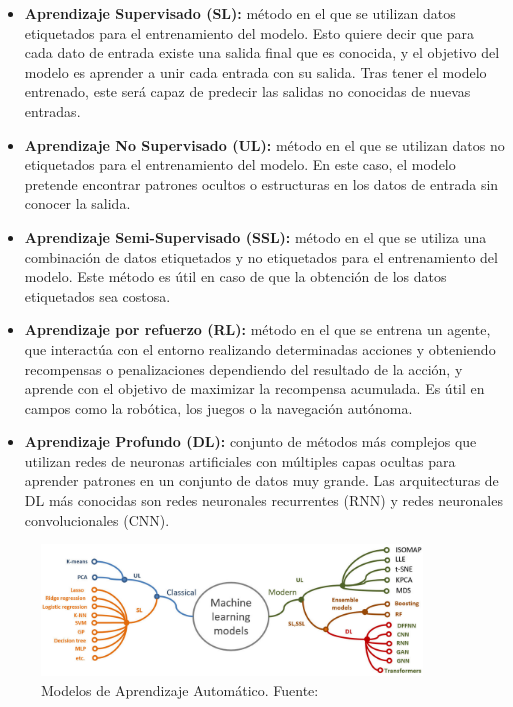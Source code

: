 \documentclass[12pt]{report} %
\begin{document}
\begin{itemize}

    \item \textbf{Aprendizaje Supervisado (SL):} método en el que se utilizan datos etiquetados para el entrenamiento del modelo. Esto quiere decir que para cada dato de entrada existe una salida final que es conocida, y el objetivo del modelo es aprender a unir cada entrada con su salida. Tras tener el modelo entrenado, este será capaz de predecir las salidas no conocidas de nuevas entradas.
    \item \textbf{Aprendizaje No Supervisado (UL):} método en el que se utilizan datos no etiquetados para el entrenamiento del modelo. En este caso, el modelo pretende encontrar patrones ocultos o estructuras en los datos de entrada sin conocer la salida.
    \item \textbf{Aprendizaje Semi-Supervisado (SSL):} método en el que se utiliza una combinación de datos etiquetados y no etiquetados para el entrenamiento del modelo. Este método es útil en caso de que la obtención de los datos etiquetados sea costosa.
    \item \textbf{Aprendizaje por refuerzo (RL):} método en el que se entrena un agente, que interactúa con el entorno realizando determinadas acciones y obteniendo recompensas o penalizaciones dependiendo del resultado de la acción, y aprende con el objetivo de maximizar la recompensa acumulada. Es útil en campos como la robótica, los juegos o la navegación autónoma.
    \item \textbf{Aprendizaje Profundo (DL):} conjunto de métodos más complejos que utilizan redes de neuronas artificiales con múltiples capas ocultas para aprender patrones en un conjunto de datos muy grande. Las arquitecturas de DL más conocidas son redes neuronales recurrentes (RNN) y redes neuronales convolucionales (CNN).

\end{itemize}

\begin{figure}[h]
	\centering
	\includegraphics[width=0.9\textwidth]{modelsML.png}
	\caption{Modelos de Aprendizaje Automático. Fuente: \cite{artInt}}
	\label{fig:imagen24}
\end{figure}
\end{document}
